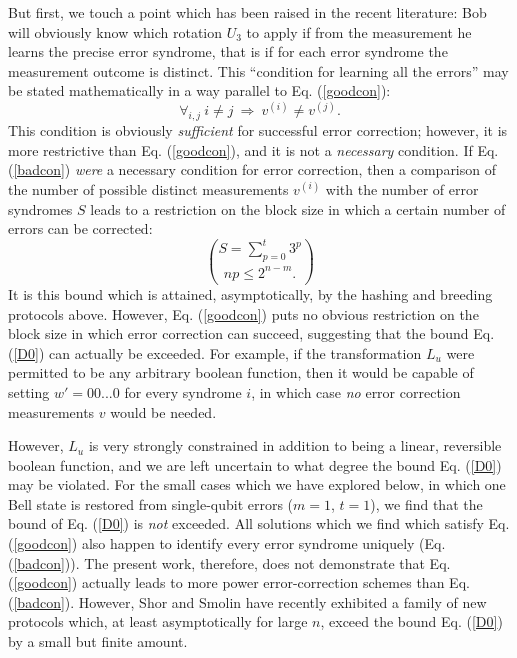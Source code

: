 But first, we touch a point which has been raised in the recent
literature:\cite{Steane,CS,EM,Laflamme} Bob will obviously know which
rotation $U_3$ to apply if from the measurement he learns the precise
error syndrome, that is if for each error syndrome the measurement
outcome is distinct.  This ``condition for learning all the errors''
may be stated mathematically in a way parallel to Eq.
(\ref{goodcon}):
\begin{equation}
\forall_{i,j}\ i\ne j\ \Longrightarrow\ v^{(i)}\ne v^{(j)}.
\label{badcon}
\end{equation}
This condition is obviously {\it sufficient} for successful error
correction; however, it is more restrictive than Eq. (\ref{goodcon}),
and it is not a {\it necessary} condition.  If Eq. (\ref{badcon}) {\it
were} a necessary condition for error correction, then a comparison of
the number of possible distinct measurements $v^{(i)}$ with the number
of error syndromes $S$ leads\cite{EM,Laflamme} to a restriction on the
block size in which a certain number of errors can be corrected:
\begin{equation}
S=\sum_{p=0}^t3^p\choose{n}{p}\le 2^{n\!-\!m}.\label{D0}
\end{equation}
It is this bound which is attained, asymptotically, by the hashing and
breeding protocols above.  However, Eq. (\ref{goodcon}) puts no
obvious restriction on the block size in which error correction can
succeed, suggesting that the bound Eq. (\ref{D0}) can actually be
exceeded.  For example, if the transformation $L_u$ were permitted to
be any arbitrary boolean function, then it would be capable of
setting $w'=00...0$ for every syndrome $i$, in which case {\it no}
error correction measurements $v$ would be needed.
 
However, $L_u$ is very strongly constrained in addition to being a
linear, reversible boolean function, and we are left uncertain to what
degree the bound Eq. (\ref{D0}) may be violated.  For the small cases
which we have explored below, in which one Bell state is restored from
single-qubit errors ($m=1$, $t=1$), we find that the bound of
Eq. (\ref{D0}) is {\it not} exceeded.  All solutions which we find
which satisfy Eq. (\ref{goodcon}) also happen to identify every error
syndrome uniquely (Eq. (\ref{badcon})).  The present work, therefore,
does not demonstrate that Eq. (\ref{goodcon}) actually leads to more
power error-correction schemes than Eq. (\ref{badcon}).  However, Shor
and Smolin\cite{jumpthegun} have recently exhibited a family of new
protocols which, at least asymptotically for large $n$, exceed the
bound Eq. (\ref{D0}) by a small but finite amount.
 
